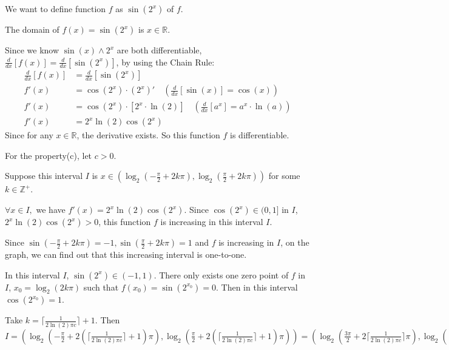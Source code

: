\documentclass[12pt]{exam}
\newcommand{\R}{\mathbb{R}}
\newcommand{\Z}{\mathbb{Z}}
\begin{document}
\begin{enumerate}
We want to define function $f$ as $\sin(2^x)$ of $f$.

The domain of $f(x)=\sin(2^x)$ is $x\in\R.$

Since we know $\sin(x) \land 2^x$ are both differentiable, $\frac{d}{dx}[f(x)]=\frac{d}{dx}[\sin(2^x)]$, by using the Chain Rule:
\begin{align*}
    \frac{d}{dx}[f(x)]&=\frac{d}{dx}[\sin(2^x)]\\
    f'(x)&=\cos(2^x)\cdot(2^x)'\quad(\frac{d}{dx}[\sin(x)]=\cos(x))\\
    f'(x)&=\cos(2^x)\cdot[2^x\cdot\ln(2)]\quad(\frac{d}{dx}[a^x]=a^x\cdot\ln(a))\\
    f'(x)&=2^x\ln(2)\cos(2^x)
\end{align*}
Since for any $x\in\R$, the derivative exists. So this function $f$ is differentiable.

For the property(c), let $c>0.$

Suppose this interval $I$ is $x\in(\log_2(-\frac{\pi}{2}+2k\pi),\log_2(\frac{\pi}{2}+2k\pi))$ for some $k\in \Z^+$.

$\forall x \in I,$ we have $f'(x)=2^x\ln(2)\cos(2^x).$ Since $\cos(2^x)\in(0,1]$ in $I$, $2^x\ln(2)\cos(2^x)>0$, this function $f$ is increasing in this interval $I.$

Since $\sin(-\frac{\pi}{2}+2k\pi)=-1, \sin(\frac{\pi}{2}+2k\pi)=1$ and $f$ is increasing in $I$, on the graph, we can find out that this increasing interval is one-to-one.

In this interval $I$, $\sin(2^x)\in(-1,1).$ There only exists one zero point of $f$ in $I$, $x_0=\log_2(2k\pi)$ such that $f(x_0)=\sin(2^{x_0})=0.$ Then in this interval $\cos(2^{x_0})=1.$

Take $k=\lceil\frac{1}{2\ln(2)\pi c}\rceil+1.$ Then $I=(\log_2(-\frac{\pi}{2}+2(\lceil\frac{1}{2\ln(2)\pi c}\rceil+1)\pi),\log_2(\frac{\pi}{2}+2(\lceil\frac{1}{2\ln(2)\pi c}\rceil+1)\pi))=(\log_2(\frac{3\pi}{2}+2\lceil\frac{1}{2\ln(2)\pi c}\rceil\pi),\log_2(\frac{5\pi}{2}+2\lceil\frac{1}{2\ln(2)\pi c}\rceil\pi))$


\end{enumerate}
\end{document}
